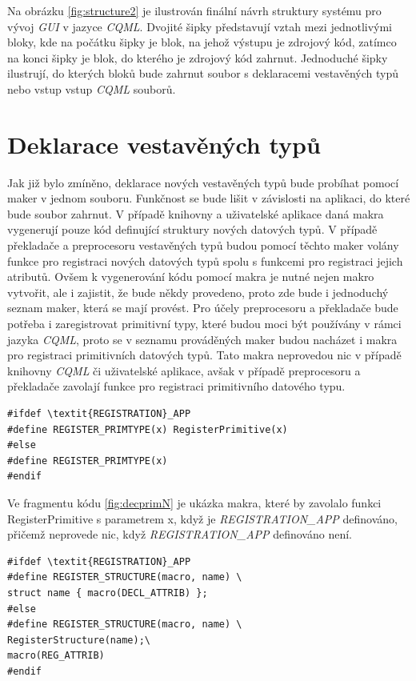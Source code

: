 \documentclass[11pt,twoside,a4paper]{book}
\begin{document}
{{\begin{ttemize}
{{Na obrázku \ref{fig:structure2} je ilustrován finální návrh struktury systému pro vývoj \textit{GUI} v jazyce \textit{CQML}. Dvojité šipky představují vztah mezi jednotlivými bloky, kde na počátku šipky je blok, na jehož výstupu je zdrojový kód, zatímco na konci šipky je blok, do kterého je zdrojový kód zahrnut. Jednoduché šipky ilustrují, do kterých bloků bude zahrnut soubor s deklaracemi vestavěných typů nebo vstup vstup \textit{CQML} souborů.

\section{\label{SEC:macN}Deklarace vestavěných typů}
Jak již bylo zmíněno, deklarace nových vestavěných typů bude probíhat pomocí maker v jednom souboru. Funkčnost se bude lišit v závislosti na aplikaci, do které bude soubor zahrnut. V případě knihovny a uživatelské aplikace daná makra vygenerují pouze kód definující struktury nových datových typů. V případě překladače a preprocesoru vestavěných typů budou pomocí těchto maker volány funkce pro registraci nových datových typů spolu s funkcemi pro registraci jejich atributů. Ovšem k vygenerování kódu pomocí makra je nutné nejen makro vytvořit, ale i zajistit, že bude někdy provedeno, proto zde bude i jednoduchý seznam maker, která se mají provést. Pro účely preprocesoru a překladače bude potřeba i zaregistrovat primitivní typy, které budou moci být používány v rámci jazyka \textit{CQML}, proto se v seznamu prováděných maker budou nacházet i makra pro registraci primitivních datových typů. Tato makra neprovedou nic v případě knihovny \textit{CQML} či uživatelské aplikace, avšak v případě preprocesoru a překladače zavolají funkce pro registraci primitivního datového typu.

\begin{lstlisting}[frame=single,caption=Řešení v pseudokódu problematického použití operátoru "." v přiřazovacím výroku,label=lst:decprimN]
#ifdef \textit{REGISTRATION}_APP
#define REGISTER_PRIMTYPE(x) RegisterPrimitive(x)
#else
#define REGISTER_PRIMTYPE(x)
#endif
\end{lstlisting}
Ve fragmentu kódu \ref{fig:decprimN} je ukázka makra, které by zavolalo funkci RegisterPrimitive s parametrem x, když je \textit{REGISTRATION\_APP} definováno, přičemž neprovede nic, když  \textit{REGISTRATION\_APP} definováno není.


\begin{lstlisting}[frame=single,caption=Řešení v pseudokódu problematického použití operátoru "." v přiřazovacím výroku,label=lst:decN]
#ifdef \textit{REGISTRATION}_APP
#define REGISTER_STRUCTURE(macro, name) \
struct name { macro(DECL_ATTRIB) };
#else
#define REGISTER_STRUCTURE(macro, name) \
RegisterStructure(name);\
macro(REG_ATTRIB) 
#endif


\end{lstlisting}}}
\end{ttemize}}}
\end{document}
